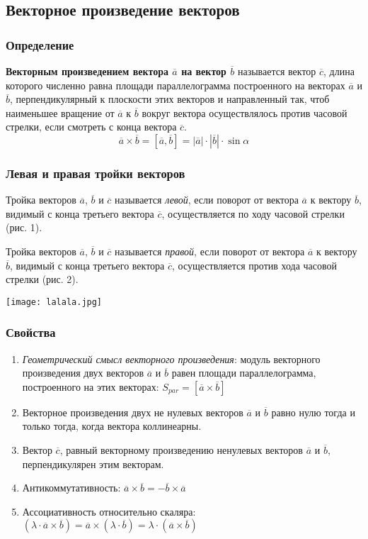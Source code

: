 \documentclass{article}
\begin{document}
\subsection{Векторное произведение векторов}
\subsubsection{Определение}
\textbf{Векторным произведением вектора $\overline{a}$ на вектор $\overline{b}$} называется вектор $\overline{c}$, длина которого
численно равна площади параллелограмма построенного на векторах $\overline{a}$ и $\overline{b}$,
перпендикулярный к плоскости этих векторов и направленный так, чтоб наименьшее
вращение от $\overline{a}$ к $\overline{b}$ вокруг вектора осуществлялось против часовой стрелки, если
смотреть с конца вектора $\overline{c}$.
$$\overline{a}\times\overline{b}=[\overline{a},\overline{b}]=|\overline{a}|\cdot|\overline{b}|\cdot\sin\alpha$$
\subsubsection{Левая и правая тройки векторов}
Тройка векторов $\overline{a}$, $\overline{b}$ и  $\overline{c}$ называется \textit{левой}, если поворот от вектора $\overline{a}$ к вектору $\overline{b}$,
видимый с конца третьего вектора $\overline{c}$, осуществляется по ходу часовой стрелки (рис. 1).

Тройка векторов $\overline{a}$, $\overline{b}$ и  $\overline{c}$ называется \textit{правой}, если поворот от вектора $\overline{a}$ к вектору $\overline{b}$,
видимый с конца третьего вектора $\overline{c}$, осуществляется против хода часовой стрелки (рис. 2).
\begin{center}
\texttt{[image: lalala.jpg]}
\end{center}
\subsubsection{Свойства}
\begin{enumerate}
    \item \textit{Геометрический смысл векторного произведения}: модуль векторного произведения двух векторов $\overline{a}$ и $\overline{b}$ равен площади параллелограмма, построенного на этих векторах: $S_{par} = [\overline{a} \times \overline{b}]$
    \item Векторное произведения двух не нулевых векторов $\overline{a}$ и $\overline{b}$ равно нулю тогда и только  тогда, когда вектора коллинеарны.
    \item Вектор $\overline{c}$, равный векторному произведению ненулевых векторов $\overline{a}$ и $\overline{b}$, перпендикулярен этим векторам.
    \item Антикоммутативность: $\overline{a} \times \overline{b}=-\overline{b}\times\overline{a}$
    \item Ассоциативность относительно скаляра: $(\lambda\cdot\overline{a}\times\overline{b})=\overline{a}\times(\lambda\cdot\overline{b})=\lambda\cdot(\overline{a}\times\overline{b})$

\end{enumerate}
\end{document}
